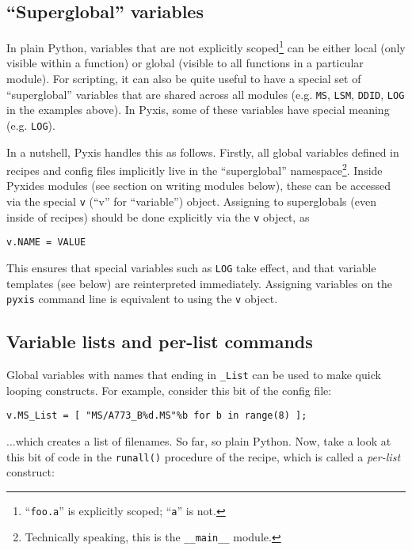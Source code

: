 \documentclass[a4paper,10pt]{article}
\begin{document}
\subsection{``Superglobal'' variables}

In plain Python, variables that are not explicitly scoped\footnote{``{\tt foo.a}'' is explicitly scoped; ``{\tt a}'' is not.} can be either local (only visible within a function) or global (visible to all functions in a particular module). For scripting, it can
also be quite useful to have a special set of ``superglobal'' variables that are shared across all modules (e.g. {\tt MS}, {\tt LSM}, {\tt DDID}, {\tt LOG} in the examples above). In Pyxis, some of these variables have special meaning (e.g. {\tt LOG}). 

In a nutshell, Pyxis handles this as follows. Firstly, all global variables defined in recipes and config files implicitly live in the ``superglobal'' namespace\footnote{Technically speaking, this is the {\tt \_\_main\_\_} module.}. Inside Pyxides modules (see section on writing modules below), these can be accessed via the special {\tt v} (``v'' for ``variable'') object. Assigning to superglobals (even inside of recipes) should be done explicitly via the {\tt v} object, as 

\begin{verbatim}
v.NAME = VALUE  
\end{verbatim}

This ensures that special variables such as {\tt LOG} take effect, and that variable templates (see below) are reinterpreted immediately. Assigning variables on the {\tt pyxis} command line is equivalent to using the {\tt v} object.

\subsection{Variable lists and per-list commands}

Global variables with names that ending in {\tt \_List} can be used to make quick looping constructs. For example, consider 
this bit of the config file:

\begin{verbatim}
v.MS_List = [ "MS/A773_B%d.MS"%b for b in range(8) ];
\end{verbatim}

...which creates a list of filenames. So far, so plain Python. Now, take a look at this bit of code in 
the {\tt runall()} procedure of the recipe, which is called a {\em per-list} construct:
\end{document}
